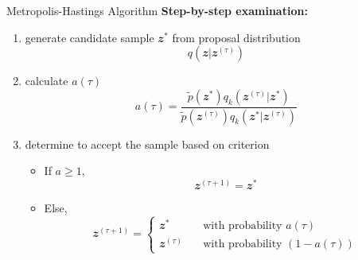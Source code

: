 \documentclass{bredelebeamer}
\begin{document}
\begin{frame}{Metropolis-Hastings Algorithm}
  \textbf{Step-by-step examination:}
  \begin{enumerate}
    \item generate candidate sample $\mathbfit{z}^{*}$ from proposal distribution
    \begin{equation}
      q(\mathbfit{z}|\mathbfit{z}^{(\tau)})
    \end{equation}

    \item calculate $a(\tau)$
    \begin{equation}
      a(\tau) =
      \frac{\tilde{p}(\mathbfit{z}^{*}) q_k(\mathbfit{z}^{(\tau)}|\mathbfit{z}^{*})}
      {\tilde{p}(\mathbfit{z}^{(\tau)}) q_k(\mathbfit{z}^{*}|\mathbfit{z}^{(\tau)})}
    \end{equation}
    \item determine to accept the sample based on criterion

    \begin{itemize}
      \item If $a \geq 1$,
      \begin{equation}
        \mathbfit{z}^{(\tau + 1)} = \mathbfit{z}^{*}
      \end{equation}
      \item Else,
      \begin{equation}
        \mathbfit{z}^{(\tau + 1)} =
        \left\{
        \begin{array}{ll}
          \mathbfit{z}^{*}      \quad & \textrm{with probability $a(\tau)$} \\
          \mathbfit{z}^{(\tau)} \quad & \textrm{with probability $(1 - a(\tau))$}
        \end{array}
        \right.
      \end{equation}
    \end{itemize}
  \end{enumerate}
\end{frame}
\end{document}
